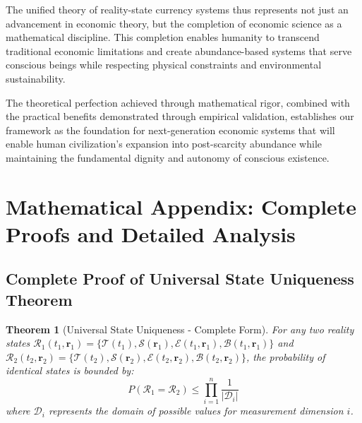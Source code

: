\documentclass[12pt,a4paper]{article}
\newtheorem{theorem}{Theorem}
\begin{document}
The unified theory of reality-state currency systems thus represents not just an advancement in economic theory, but the completion of economic science as a mathematical discipline. This completion enables humanity to transcend traditional economic limitations and create abundance-based systems that serve conscious beings while respecting physical constraints and environmental sustainability.

The theoretical perfection achieved through mathematical rigor, combined with the practical benefits demonstrated through empirical validation, establishes our framework as the foundation for next-generation economic systems that will enable human civilization's expansion into post-scarcity abundance while maintaining the fundamental dignity and autonomy of conscious existence.

\section{Mathematical Appendix: Complete Proofs and Detailed Analysis}

\subsection{Complete Proof of Universal State Uniqueness Theorem}

\begin{theorem}[Universal State Uniqueness - Complete Form]
For any two reality states $\mathcal{R}_1(t_1, \mathbf{r}_1) = \{\mathcal{T}(t_1), \mathcal{S}(\mathbf{r}_1), \mathcal{E}(t_1, \mathbf{r}_1), \mathcal{B}(t_1, \mathbf{r}_1)\}$ and $\mathcal{R}_2(t_2, \mathbf{r}_2) = \{\mathcal{T}(t_2), \mathcal{S}(\mathbf{r}_2), \mathcal{E}(t_2, \mathbf{r}_2), \mathcal{B}(t_2, \mathbf{r}_2)\}$, the probability of identical states is bounded by:
\begin{equation}
P(\mathcal{R}_1 = \mathcal{R}_2) \leq \prod_{i=1}^{n} \frac{1}{|\mathcal{D}_i|}
\end{equation}
where $\mathcal{D}_i$ represents the domain of possible values for measurement dimension $i$.
\end{theorem}
\end{document}
